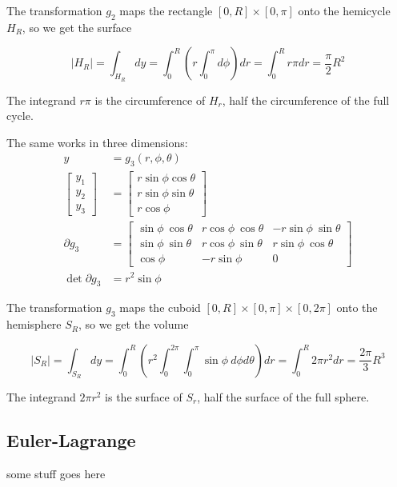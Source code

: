 \documentclass{article}
\begin{document}
The transformation $g_2$ maps the rectangle $[0, R] \times [0, \pi]$ onto the hemicycle $H_{R}$, so we get the surface

\begin{equation*}
\lvert H_{R} \rvert = \int_{H_{R}} dy =  \int_0^{R} (r \int_0^{\pi} d\phi) dr = \int_0^{R} r \pi dr = \frac{\pi}{2} R^2
\end{equation*}

The integrand $r \pi$ is the circumference of $H_{r}$, half the circumference of the full cycle.

The same works in three dimensions: 
\begin{align*}
y &=  g_3(r, \phi, \theta) \\
\begin{bmatrix}
y_1 \\
y_2 \\
y_3
\end{bmatrix} &= \begin{bmatrix}
r \sin \phi \cos \theta \\
r \sin \phi \sin \theta \\
r \cos \phi 
\end{bmatrix} \\
\partial g_3 &= \begin{bmatrix}
\sin \phi \: \cos \theta & r  \cos \phi \: \cos \theta & -r \sin \phi \: \sin \theta \\
\sin \phi \: \sin \theta & r  \cos \phi \: \sin \theta & r \sin \phi \: \cos \theta \\
\cos \phi             & -r  \sin \phi            & 0
\end{bmatrix} \\
\det \partial g_3 &= r^2 \sin \phi
\end{align*}

The transformation $g_3$ maps the cuboid $[0, R] \times [0, \pi] \times [0, 2 \pi]$ onto the hemisphere $S_{R}$, so we get the volume

\begin{equation*}
\lvert S_{R} \rvert = \int_{S_{R}} dy =  \int_0^{R} (r^2 \int_0^{2\pi} \int_0^{\pi} \sin \phi \: d\phi d\theta) dr = \int_0^R 2 \pi r^2 dr = \frac{2 \pi}{3} R^3
\end{equation*}

The integrand $2 \pi r^2$ is the surface of  $S_{r}$, half the surface of the full sphere.

\subsection{Euler-Lagrange}

some stuff goes here




\end{document}
